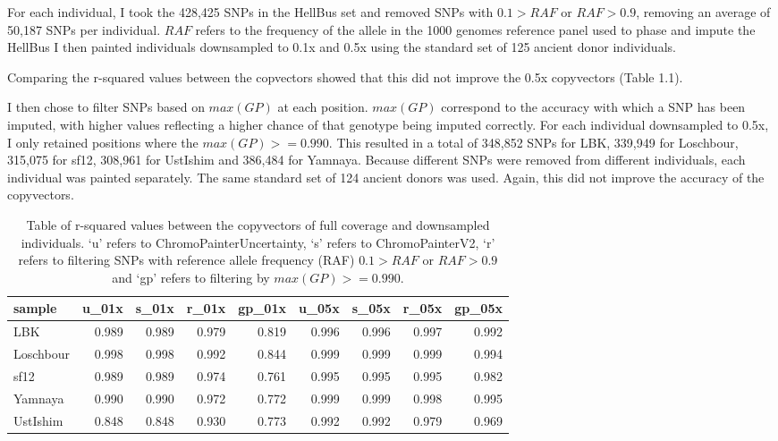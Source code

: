 For each individual, I took the 428,425 SNPs in the HellBus set and removed SNPs with $0.1 > RAF$ or $RAF > 0.9$, removing an average of 50,187 SNPs per individual. $RAF$ refers to the frequency of the allele in the 1000 genomes reference panel used to phase and impute the HellBus I then painted individuals downsampled to 0.1x and 0.5x using the standard set of 125 ancient donor individuals.  

Comparing the r-squared values between the copvectors showed that this did not improve the 0.5x copyvectors (Table 1.1). 

I then chose to filter SNPs based on $max(GP)$ at each position. $max(GP)$ correspond to the accuracy with which a SNP has been imputed, with higher values reflecting a higher chance of that genotype being imputed correctly. For each individual downsampled to 0.5x, I only retained positions where the $max(GP) >= 0.990$. This resulted in a total of 348,852 SNPs for LBK, 339,949 for Loschbour, 315,075 for sf12, 308,961 for UstIshim and 386,484 for Yamnaya. Because different SNPs were removed from different individuals, each individual was painted separately. The same standard set of 124 ancient donors was used. Again, this did not improve the accuracy of the copyvectors. 

\begin{table}
\centering
\begin{tabular}[t]{lrrrrrrrr}
\toprule
sample & u\_01x & s\_01x & r\_01x & gp\_01x & u\_05x & s\_05x & r\_05x & gp\_05x\\
\midrule
LBK & 0.989 & 0.989 & 0.979 & 0.819 & 0.996 & 0.996 & 0.997 & 0.992\\
Loschbour & 0.998 & 0.998 & 0.992 & 0.844 & 0.999 & 0.999 & 0.999 & 0.994\\
sf12 & 0.989 & 0.989 & 0.974 & 0.761 & 0.995 & 0.995 & 0.995 & 0.982\\
Yamnaya & 0.990 & 0.990 & 0.972 & 0.772 & 0.999 & 0.999 & 0.998 & 0.995\\
UstIshim & 0.848 & 0.848 & 0.930 & 0.773 & 0.992 & 0.992 & 0.979 & 0.969\\
\bottomrule
\end{tabular}
\caption{Table of r-squared values between the copyvectors of full coverage and downsampled individuals. `u' refers to ChromoPainterUncertainty, `s' refers to ChromoPainterV2, `r' refers to filtering SNPs with reference allele frequency (RAF) $0.1 > RAF$ or $RAF > 0.9$ and `gp' refers to filtering by $max(GP) >= 0.990$.}
\end{table}

